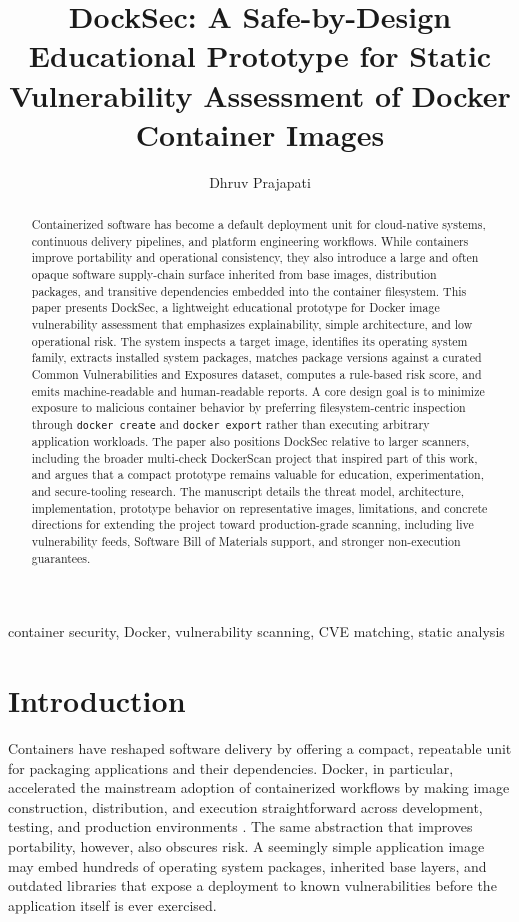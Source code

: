 \documentclass[12pt,draftclsnofoot,onecolumn]{IEEEtran}
\title{DockSec: A Safe-by-Design Educational Prototype for Static Vulnerability Assessment of Docker Container Images}
\author{Dhruv Prajapati}
\begin{document}
\maketitle

\begin{abstract}
Containerized software has become a default deployment unit for cloud-native systems, continuous delivery pipelines, and platform engineering workflows. While containers improve portability and operational consistency, they also introduce a large and often opaque software supply-chain surface inherited from base images, distribution packages, and transitive dependencies embedded into the container filesystem. This paper presents DockSec, a lightweight educational prototype for Docker image vulnerability assessment that emphasizes explainability, simple architecture, and low operational risk. The system inspects a target image, identifies its operating system family, extracts installed system packages, matches package versions against a curated Common Vulnerabilities and Exposures dataset, computes a rule-based risk score, and emits machine-readable and human-readable reports. A core design goal is to minimize exposure to malicious container behavior by preferring filesystem-centric inspection through \texttt{docker create} and \texttt{docker export} rather than executing arbitrary application workloads. The paper also positions DockSec relative to larger scanners, including the broader multi-check DockerScan project that inspired part of this work, and argues that a compact prototype remains valuable for education, experimentation, and secure-tooling research. The manuscript details the threat model, architecture, implementation, prototype behavior on representative images, limitations, and concrete directions for extending the project toward production-grade scanning, including live vulnerability feeds, Software Bill of Materials support, and stronger non-execution guarantees.
\end{abstract}

\begin{IEEEkeywords}
container security, Docker, vulnerability scanning, CVE matching, static analysis
\end{IEEEkeywords}

\section{Introduction}
Containers have reshaped software delivery by offering a compact, repeatable unit for packaging applications and their dependencies. Docker, in particular, accelerated the mainstream adoption of containerized workflows by making image construction, distribution, and execution straightforward across development, testing, and production environments \cite{merkel2014docker}. The same abstraction that improves portability, however, also obscures risk. A seemingly simple application image may embed hundreds of operating system packages, inherited base layers, and outdated libraries that expose a deployment to known vulnerabilities before the application itself is ever exercised.
\end{document}
